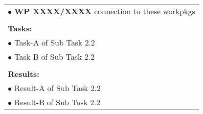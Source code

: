 \begin{table}[!h]
\begin{center}
\begin{tabular}{|p{}||p{}|p{}||p{}|}
            \multicolumn{4}{|p{.95\columnwidth}|}{$\bullet$ \textbf{WP XXXX/XXXX} connection to these workpkgs}\\
            \multicolumn{4}{|p{.95\columnwidth}|}{}\\
            \multicolumn{4}{|p{.95\columnwidth}|}{\textbf{Tasks:}}\\
            \multicolumn{4}{|p{.95\columnwidth}|}{$\bullet$ Task-A of Sub Task 2.2}\\
            \multicolumn{4}{|p{.95\columnwidth}|}{$\bullet$ Task-B of Sub Task 2.2}\\
            \multicolumn{4}{|p{.95\columnwidth}|}{}\\
            \multicolumn{4}{|p{.95\columnwidth}|}{\textbf{Results:}}\\
            \multicolumn{4}{|p{.95\columnwidth}|}{$\bullet$ Result-A of Sub Task 2.2}\\
            \multicolumn{4}{|p{.95\columnwidth}|}{$\bullet$ Result-B of Sub Task 2.2}\\
            \hline
        \end{tabular}
    \end{center}
\end{table}

\clearpage

